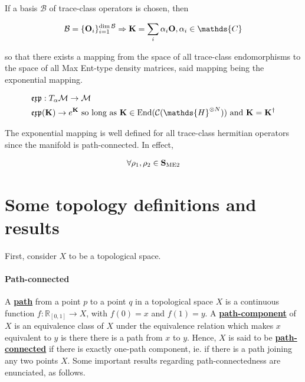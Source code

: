\documentclass{homework}
\begin{document}
If a basis $\mathcal{B}$ of trace-class operators is chosen, then

$$
    \mathcal{B} = \{{\bf O}_i\}_{i=1}^{\dim \mathcal{B}} \Rightarrow {\bf K} = \sum_{i} \alpha_i {\bf O}, \alpha_i \in \mathds{C}
 $$
 
so that there exists a mapping from the space of all trace-class endomorphisms to the space of all Max Ent-type density matrices, said mapping being the exponential mapping.

\begin{align*}
    &\mathfrak{e}\mathfrak{x}\mathfrak{p}: T_{\alpha} \mathcal{M} \rightarrow \mathcal{M} \\
    &\mathfrak{e}\mathfrak{x}\mathfrak{p}({\bf K}) \rightarrow e^{{\bf K}} \textnormal{ so long as } {\bf K} \in \textnormal{End}(\mathcal{C}(\mathds{H}^{\otimes N})) \textnormal{ and } {\bf K} = {\bf K}^{\dagger}
\end{align*}

The exponential mapping is well defined for all trace-class hermitian operators since the manifold is path-connected. In effect, 


\begin{align}
    \forall \rho_1, \rho_2 \in \mathcal{\bf S}_{\textnormal{ME2}}     
\end{align}

\fi

\section{Some topology definitions and results}

First, consider $X$ to be a topological space.\\

\paragraph{\textbf{Path-connected}}

A \textbf{\underline{path}} from a point $p$ to a point $q$ in a topological space $X$ is a continuous function $f: \mathds{R}_{[0,1]} \to X$, with $f(0) = x$ and $f(1) = y$. A \textbf{\underline{path-component}} of $X$ is an equivalence class of $X$ under the equivalence relation which makes $x$ equivalent to $y$ is there there is a path from $x$ to $y$. Hence, $X$ is said to be \textbf{\underline{path-connected}} if there is exactly one-path component, ie. if there is a path joining any two points $X$. Some important results regarding path-connectedness are enunciated, as follows.
\end{document}
